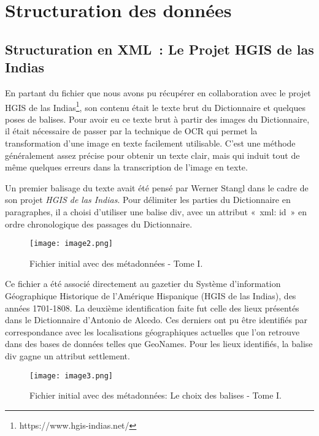 \documentclass[a4paper,12pt,twoside]{book}
\begin{document}
\clearpage
\section{Structuration des données}
\subsection{Structuration en XML : Le Projet HGIS de las Indias}

En partant du fichier que nous avons pu récupérer en collaboration avec le projet HGIS de las Indias\footnote{https://www.hgis-indias.net/}, son contenu était le texte brut du Dictionnaire et quelques poses de balises. Pour avoir eu ce texte brut à partir des images du Dictionnaire, il était nécessaire de passer par la technique de \Gls{OCR} qui permet la transformation d’une image en texte facilement utilisable. C’est une méthode généralement assez précise pour obtenir un texte clair, mais qui induit tout de même quelques erreurs dans la transcription de l’image en texte. 

Un premier balisage du texte avait été pensé par Werner Stangl dans le cadre de son projet \textit{HGIS de las Indias}. Pour délimiter les parties du Dictionnaire en paragraphes, il a choisi d’utiliser une balise div, avec un attribut « xml: id » en ordre chronologique des passages du Dictionnaire.\\
	

\begin{figure}[!h]
    \centering
    \texttt{[image: image2.png]}
    \caption{Fichier initial avec des métadonnées - Tome I.}
    \label{deuxFig}
\end{figure}


Ce fichier a été associé directement au gazetier du Système d’information Géographique Historique de l’Amérique Hispanique (HGIS de las Indias), des années 1701-1808. La deuxième identification faite fut celle des lieux présentés dans le Dictionnaire d’Antonio de Alcedo. Ces derniers ont pu être identifiés par correspondance avec les localisations géographiques actuelles que l’on retrouve dans des bases de données telles que GeoNames. Pour les lieux identifiés, la balise div gagne un attribut settlement.\\
	
\begin{figure}[!h]
    \centering
    \texttt{[image: image3.png]}
    \caption{Fichier initial avec des métadonnées: Le choix des balises - Tome I.}
    \label{troisFig}
\end{figure}	
	
\end{document}
